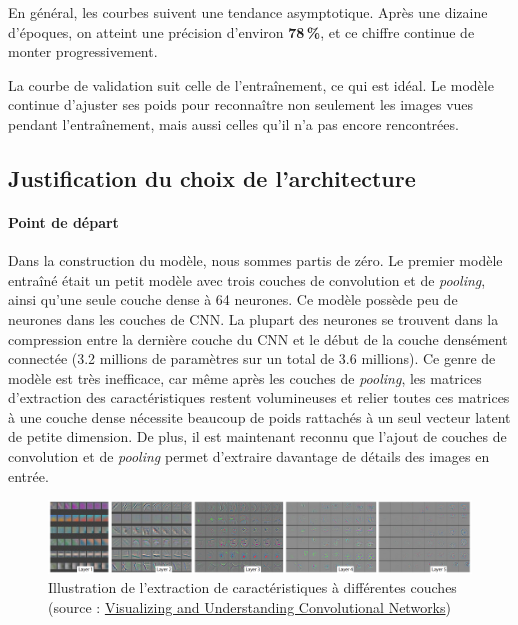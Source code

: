 \documentclass{article}
\begin{document}
En général, les courbes suivent une tendance asymptotique. Après une dizaine d’époques, on atteint une précision d’environ \textbf{78\,\%}, et ce chiffre continue de monter progressivement.

La courbe de validation suit celle de l’entraînement, ce qui est idéal. Le modèle continue d’ajuster ses poids pour reconnaître non seulement les images vues pendant l’entraînement, mais aussi celles qu’il n’a pas encore rencontrées.

\subsection{ Justification du choix de l’architecture}

\paragraph{Point de départ}

Dans la construction du modèle, nous sommes partis de zéro. Le premier modèle entraîné était un petit modèle avec trois couches de convolution et de \emph{pooling}, ainsi qu’une seule couche dense à 64 neurones. Ce modèle possède peu de neurones dans les couches de CNN. La plupart des neurones se trouvent dans la compression entre la dernière couche du CNN et le début de la couche densément connectée (3.2 millions de paramètres sur un total de 3.6 millions). Ce genre de modèle est très inefficace, car même après les couches de \emph{pooling}, les matrices d'extraction des caractéristiques restent volumineuses et relier toutes ces matrices à une couche dense nécessite beaucoup de poids rattachés à un seul vecteur latent de petite dimension. De plus, il est maintenant reconnu que l'ajout de couches de convolution et de \emph{pooling} permet d'extraire davantage de détails des images en entrée.

\begin{figure}[H]
    \centering
    \includegraphics[width=1\textwidth]{assets/feature_extractions.PNG}
    \caption{Illustration de l'extraction de caractéristiques à différentes couches (source : \href{https://arxiv.org/abs/1311.2901}{Visualizing and Understanding Convolutional Networks})}
\end{figure}
\end{document}
